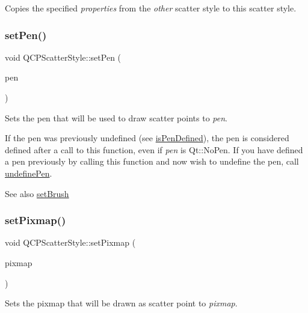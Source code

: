 Copies the specified {\itshape properties} from the {\itshape other} scatter style to this scatter style. \mbox{\label{classQCPScatterStyle_a761f1f229cc0ca4703e1e2b89f6dd1ba}} 
\subsubsection{\texorpdfstring{set\+Pen()}{setPen()}}
{\footnotesize\ttfamily void Q\+C\+P\+Scatter\+Style\+::set\+Pen (\begin{DoxyParamCaption}\item[{const Q\+Pen \&}]{pen }\end{DoxyParamCaption})}

Sets the pen that will be used to draw scatter points to {\itshape pen}.

If the pen was previously undefined (see \hyperlink{classQCPScatterStyle_a47077eb6450fe9a788f833e4ec1b1d5a}{is\+Pen\+Defined}), the pen is considered defined after a call to this function, even if {\itshape pen} is {\ttfamily Qt\+::\+No\+Pen}. If you have defined a pen previously by calling this function and now wish to undefine the pen, call \hyperlink{classQCPScatterStyle_acabc2a8c83d650b946f50c3166b6c35e}{undefine\+Pen}.

\begin{DoxySeeAlso}{See also}
\hyperlink{classQCPScatterStyle_a74d692aaeb8d4b36d6f7d510e44264b1}{set\+Brush} 
\end{DoxySeeAlso}
\mbox{\label{classQCPScatterStyle_a5fb611d46acfac520d7b89a1c71d9246}} 
\subsubsection{\texorpdfstring{set\+Pixmap()}{setPixmap()}}
{\footnotesize\ttfamily void Q\+C\+P\+Scatter\+Style\+::set\+Pixmap (\begin{DoxyParamCaption}\item[{const Q\+Pixmap \&}]{pixmap }\end{DoxyParamCaption})}

Sets the pixmap that will be drawn as scatter point to {\itshape pixmap}.

